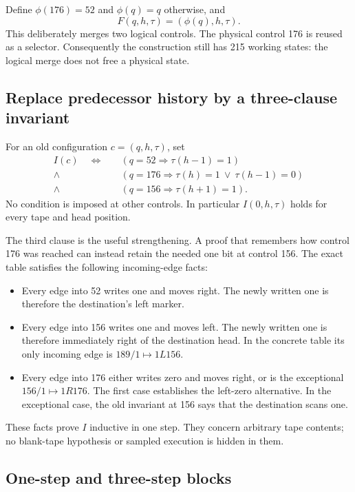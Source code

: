 \documentclass[11pt]{article}
\begin{document}
Define $\phi(176)=52$ and $\phi(q)=q$ otherwise, and
\[
F(q,h,\tau)=(\phi(q),h,\tau).
\]
This deliberately merges two logical controls. The physical control 176 is reused as a selector. Consequently the construction still has 215 working states: the logical merge does not free a physical state.

\subsection{Replace predecessor history by a three-clause invariant}

For an old configuration $c=(q,h,\tau)$, set
\begin{align*}
I(c)\quad\Longleftrightarrow\quad
 &(q=52\Rightarrow\tau(h-1)=1)\\
 {}\land{}&(q=176\Rightarrow\tau(h)=1\ \lor\ \tau(h-1)=0)\\
 {}\land{}&(q=156\Rightarrow\tau(h+1)=1).
\end{align*}
No condition is imposed at other controls. In particular $I(0,h,\tau)$ holds for every tape and head position.

The third clause is the useful strengthening. A proof that remembers how control 176 was reached can instead retain the needed one bit at control 156. The exact table satisfies the following incoming-edge facts:
\begin{itemize}
\item Every edge into 52 writes one and moves right. The newly written one is therefore the destination's left marker.
\item Every edge into 156 writes one and moves left. The newly written one is therefore immediately right of the destination head. In the concrete table its only incoming edge is $189/1\mapsto1L156$.
\item Every edge into 176 either writes zero and moves right, or is the exceptional $156/1\mapsto1R176$. The first case establishes the left-zero alternative. In the exceptional case, the old invariant at 156 says that the destination scans one.
\end{itemize}
These facts prove $I$ inductive in one step. They concern arbitrary tape contents; no blank-tape hypothesis or sampled execution is hidden in them.

\subsection{One-step and three-step blocks}
\end{document}

